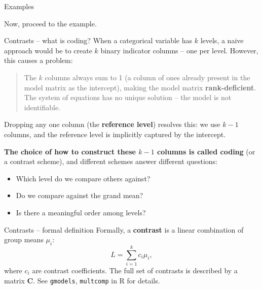 \documentclass[10pt,ignorenonframetext,aspectratio=169]{beamer}
\begin{document}
\begin{frame}{Examples}

\begin{center}
Now, proceed to the example.
\end{center}

\end{frame}



\begin{frame}{Contrasts -- what is coding?}
When a categorical variable has $k$ levels, a naive approach would be to create 
$k$ binary indicator columns -- one per level. However, this causes a problem:

\begin{quote}
The $k$ columns always sum to 1 (a column of ones already present in the model 
matrix as the intercept), making the model matrix \textbf{rank-deficient}. The 
system of equations has no unique solution -- the model is not identifiable. 
\end{quote}


Dropping any one column (the \textbf{reference level}) resolves this: we use 
$k - 1$ columns, and the reference level is implicitly captured by the intercept.

\medskip
\textbf{The choice of how to construct these $k-1$ columns is called coding} 
(or a contrast scheme), and different schemes answer different questions:
\begin{itemize}
    \item Which level do we compare others against?
    \item Do we compare against the grand mean?
    \item Is there a meaningful order among levels?
\end{itemize}
\end{frame}


\begin{frame}{Contrasts -- formal definition}
Formally, a \textbf{contrast} is a linear combination of group means $\mu_i$:
\begin{equation}
    L = \sum_{i=1}^k c_i \mu_i,
\end{equation}
where $c_i$ are contrast coefficients. The full set of contrasts is described by 
a matrix $\boldsymbol{C}$. See \texttt{gmodels}, \texttt{multcomp} in R for details.
\end{frame}
\end{document}
